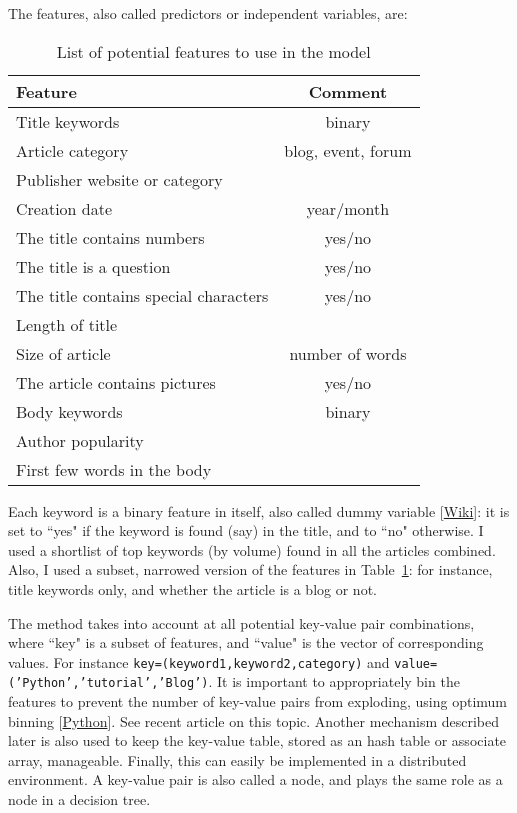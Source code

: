 \documentclass[oneside,10pt]{book}
\renewcommand{\arraystretch}{1.4} %
\begin{document}
The features, also called predictors or independent variables, are:\vspace{1ex}

\renewcommand{\arraystretch}{1.2} %

\begin{table}%
\begin{center}
\small
\begin{tabular}{lc}
\hline
   Feature & Comment \\
\hline
Title keywords &  binary\\
Article category & blog, event, forum\\
Publisher website or category & \\
Creation date & year/month\\
The title contains numbers & yes/no\\
The title is a question & yes/no \\
The title contains special characters & yes/no \\
Length of title & \\
Size of article & number of words \\
The article contains pictures & yes/no\\
Body keywords & binary \\
Author popularity & \\
First few words in the body & \\
\hline
\end{tabular}
\caption{\label{fffdsa}List of potential features to use in the model}
\end{center}
\end{table}
\renewcommand{\arraystretch}{1.0} %


\noindent Each keyword is a binary feature in itself, also called \textcolor{index}{dummy variable} [\href{https://en.wikipedia.org/wiki/Dummy_variable_(statistics)}{Wiki}]: it is set to ``yes" if the keyword is found (say) in the title, and to ``no" otherwise. I used
 a shortlist of top keywords (by volume) found in all the articles combined. Also, I used a subset, narrowed version
of the features in Table~\ref{fffdsa}: for instance, title keywords only, and whether the article is a blog or not.

 The method takes into account at all potential \textcolor{index}{key-value pair} combinations, where ``key" is a subset of features, and ``value" is the vector of corresponding values.
For instance \texttt{key=(keyword1,keyword2,category)} and \texttt{value=('Python','tutorial','Blog')}. It is important to appropriately bin the features
 to prevent the number of key-value pairs from exploding, using \textcolor{index}{optimum binning} [\href{http://gnpalencia.org/optbinning/}{Python}].
See recent article \cite{binh2020} on this topic. Another mechanism described later  is also used to keep the key-value table, stored as an hash table or associate array, manageable. Finally, this can easily be implemented in a distributed environment.
A key-value pair is also called a \textcolor{index}{node}, and plays the same role as a node in a decision tree.
\end{document}
